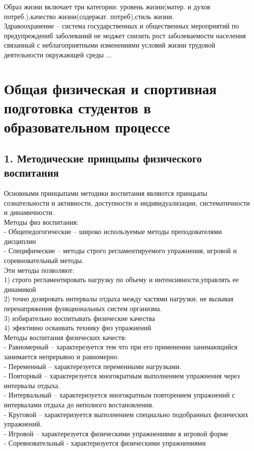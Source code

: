 \documentclass[a4paper, 12pt]{article}
\begin{document}
Образ жизни включает три категории: уровень жизни(матер. и духов потреб.),качество жизни(содержат. потреб),стиль жизни.\\

Здравоохранение -- система государственных и общественных мероприятий по предупреждениб заболеваний не моджет снизить рост заболеваемости населения связанный с неблагоприятными изменениями условий жизни трудовой деятельности окружающей среды ...\\


\section*{Общая физическая и спортивная подготовка студентов в образовательном процессе}

\subsection*{1. Методические принцыпы физического воспитания}
Основными принцыпами методики воспитания являются принцыпы сознательности и активности, доступности и индивидуализации, систематичности и динамичности.\\ 

Методы физ воспитания:\\
- Общепедогогические -- широко используемые методы преподователями дисциплин\\
- Специфические -- методы строго регламентируемого упражнения, игровой и соревновательный методы.\\
Эти методы позволяют:\\
1) строго регламентировать нагрузку по объему и интенсивности,управлять ее динамикой\\
2) точно дозировать интервалы отдыха между частями нагрузки, не вызывая перенапряжения функциональных систем организма.\\
3) избирательно воспитывать физические качества\\
4) эфективно осваивать технику физ упражнений\\


Методы воспитания физических качеств:\\
- Равномерный -- характерезуется тем что при его применении занимающийся занимается непрерывно и равномерно.\\
- Переменный -- характерезуется переменными нагрузками.\\
- Повторный -- характерезуется многократным выполнением упражнения через интервалы отдыха.\\
- Интервальный -- характеризуется иногократным повторением упражнений с интервалами отдыха до неполного востановления.\\
- Круговой -- характеризуется выполнением специально подобранных физических упражнений.\\
- Игровой -- характерезуется физическими упражнениями в игровой форме\\
- Соревновательный - характеризуется физическими упражнениями 
\end{document}
